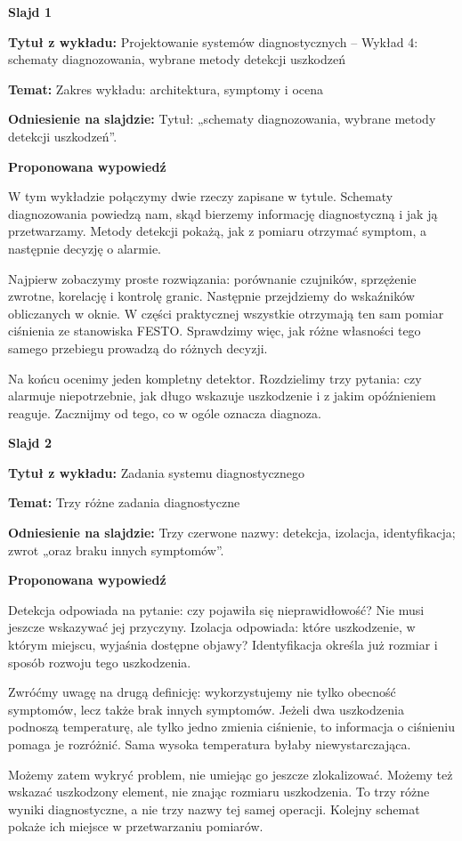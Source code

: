 \documentclass[a4paper,11pt]{article}
\newcommand{\NumerSlajdu}{1}
\newcommand{\Komentarz}[3]{%
  \gdef\NumerSlajdu{#1}%
  {\Large\bfseries Slajd #1\par}\smallskip
  \textbf{Tytuł z wykładu:} #2\par
  \textbf{Temat:} #3\par\medskip
}
\begin{document}
\Komentarz{1}{Projektowanie systemów diagnostycznych -- Wykład 4: schematy diagnozowania, wybrane metody detekcji uszkodzeń}{Zakres wykładu: architektura, symptomy i ocena}
{\small\color{black!65}\textbf{Odniesienie na slajdzie:} Tytuł: „schematy diagnozowania, wybrane metody detekcji uszkodzeń”.\par}
\medskip
\textbf{Proponowana wypowiedź}\par
W tym wykładzie połączymy dwie rzeczy zapisane w tytule. Schematy diagnozowania powiedzą nam, skąd bierzemy informację diagnostyczną i jak ją przetwarzamy. Metody detekcji pokażą, jak z pomiaru otrzymać symptom, a następnie decyzję o alarmie.

Najpierw zobaczymy proste rozwiązania: porównanie czujników, sprzężenie zwrotne, korelację i kontrolę granic. Następnie przejdziemy do wskaźników obliczanych w oknie. W części praktycznej wszystkie otrzymają ten sam pomiar ciśnienia ze stanowiska FESTO. Sprawdzimy więc, jak różne własności tego samego przebiegu prowadzą do różnych decyzji.

Na końcu ocenimy jeden kompletny detektor. Rozdzielimy trzy pytania: czy alarmuje niepotrzebnie, jak długo wskazuje uszkodzenie i z jakim opóźnieniem reaguje. Zacznijmy od tego, co w ogóle oznacza diagnoza.
\clearpage

\Komentarz{2}{Zadania systemu diagnostycznego}{Trzy różne zadania diagnostyczne}
{\small\color{black!65}\textbf{Odniesienie na slajdzie:} Trzy czerwone nazwy: detekcja, izolacja, identyfikacja; zwrot „oraz braku innych symptomów”.\par}
\medskip
\textbf{Proponowana wypowiedź}\par
Detekcja odpowiada na pytanie: czy pojawiła się nieprawidłowość? Nie musi jeszcze wskazywać jej przyczyny. Izolacja odpowiada: które uszkodzenie, w którym miejscu, wyjaśnia dostępne objawy? Identyfikacja określa już rozmiar i sposób rozwoju tego uszkodzenia.

Zwróćmy uwagę na drugą definicję: wykorzystujemy nie tylko obecność symptomów, lecz także brak innych symptomów. Jeżeli dwa uszkodzenia podnoszą temperaturę, ale tylko jedno zmienia ciśnienie, to informacja o ciśnieniu pomaga je rozróżnić. Sama wysoka temperatura byłaby niewystarczająca.

Możemy zatem wykryć problem, nie umiejąc go jeszcze zlokalizować. Możemy też wskazać uszkodzony element, nie znając rozmiaru uszkodzenia. To trzy różne wyniki diagnostyczne, a nie trzy nazwy tej samej operacji. Kolejny schemat pokaże ich miejsce w przetwarzaniu pomiarów.
\clearpage
\end{document}
